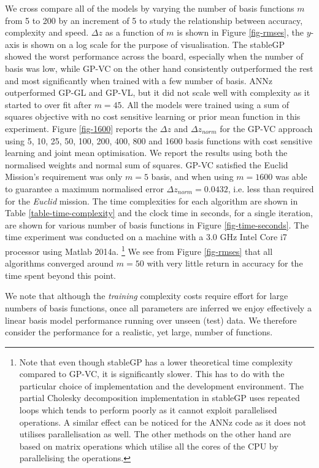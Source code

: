 \documentclass[useAMS,usenatbib,fleqn]{mn2e}
\begin{document}
We cross compare all of the models by varying the number of basis functions $m$ from 5 to 200 by an increment of 5 to study the relationship between accuracy, complexity and speed. $\Delta z$ as a function of $m$ is shown in Figure \ref{fig-rmses}, the $y$-axis is shown on a log scale for the purpose of visualisation. The stableGP showed the worst performance across the board, especially when the number of basis was low, while GP-VC on the other hand consistently outperformed the rest and most significantly when trained with a few number of basis. ANNz outperformed GP-GL and GP-VL, but it did not scale well with complexity as it started to over fit after $m=45$. All the models were trained using a sum of squares objective with no cost sensitive learning or prior mean function in this experiment. Figure \ref{fig-1600} reports the $\Delta z$ and $\Delta z_{norm}$ for the GP-VC approach using 5, 10, 25, 50, 100, 200, 400, 800 and 1600 basis functions with cost sensitive learning and joint mean optimisation. We report the results using both the normalised weights and normal sum of squares. GP-VC satisfied the Euclid Mission's requirement was only $m=5$ basis, and when using $m=1600$ was able to guarantee  a maximum normalised error $\Delta z_{norm} = 0.0432$, i.e. less than required for the {\em Euclid} mission. The  time complexities for each algorithm are shown in Table \ref{table-time-complexity} and the clock time in seconds, for a single iteration, are shown for various number of basis functions in Figure \ref{fig-time-seconds}. The time experiment was conducted on a machine with a 3.0 GHz Intel Core i7 processor using Matlab 2014a. \footnote{Note that even though stableGP has a lower theoretical time complexity compared to GP-VC, it is significantly slower. This has to do with the particular choice of implementation and the development environment. The partial Cholesky decomposition implementation in stableGP \citep{stableGP} uses repeated loops which tends to perform poorly as it cannot exploit parallelised operations. A similar effect can be noticed for the ANNz code as it does not utilises parallelisation as well. The other methods on the other hand are based on matrix operations which utilise all the cores of the CPU by parallelising the operations.} We see from Figure \ref{fig-rmses} that all algorithms converged around $m=50$ with very little return in accuracy for the time spent beyond this point.

We note that although the \emph{training} complexity costs require effort for large numbers of basis functions, once all parameters are inferred we enjoy effectively a linear basis model performance running over unseen (test) data. We therefore consider the performance for a realistic, yet large, number of functions. 
\end{document}
